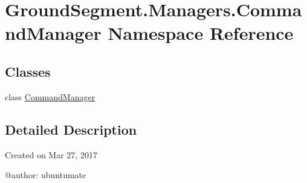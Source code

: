 \hypertarget{namespace_ground_segment_1_1_managers_1_1_command_manager}{}\section{Ground\+Segment.\+Managers.\+Command\+Manager Namespace Reference}
\label{namespace_ground_segment_1_1_managers_1_1_command_manager}
\subsection*{Classes}
\begin{DoxyCompactItemize}
\item 
class \hyperlink{class_ground_segment_1_1_managers_1_1_command_manager_1_1_command_manager}{Command\+Manager}
\end{DoxyCompactItemize}


\subsection{Detailed Description}
\begin{DoxyVerb}Created on Mar 27, 2017

@author: ubuntumate
\end{DoxyVerb}
 
